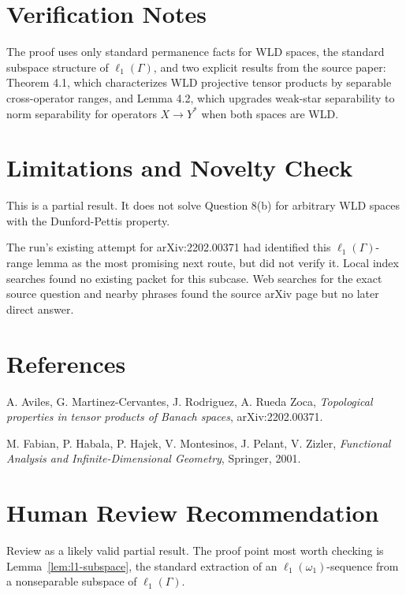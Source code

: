 \documentclass[11pt]{article}
\begin{document}
\section*{Verification Notes}

The proof uses only standard permanence facts for WLD spaces, the standard
subspace structure of \(\ell_1(\Gamma)\), and two explicit results from the
source paper: Theorem 4.1, which characterizes WLD projective tensor products
by separable cross-operator ranges, and Lemma 4.2, which upgrades weak-star
separability to norm separability for operators \(X\to Y^*\) when both spaces
are WLD.

\section*{Limitations and Novelty Check}

This is a partial result. It does not solve Question 8(b) for arbitrary WLD
spaces with the Dunford-Pettis property.

The run's existing attempt for arXiv:2202.00371 had identified this
\(\ell_1(\Gamma)\)-range lemma as the most promising next route, but did not
verify it. Local index searches found no existing packet for this subcase.
Web searches for the exact source question and nearby phrases found the source
arXiv page but no later direct answer.

\section*{References}

\begin{enumerate}[label={[\arabic*]}]
\item A. Aviles, G. Martinez-Cervantes, J. Rodriguez, A. Rueda Zoca,
\emph{Topological properties in tensor products of Banach spaces},
arXiv:2202.00371.
\item M. Fabian, P. Habala, P. Hajek, V. Montesinos, J. Pelant, V. Zizler,
\emph{Functional Analysis and Infinite-Dimensional Geometry}, Springer, 2001.
\end{enumerate}

\section*{Human Review Recommendation}

Review as a likely valid partial result. The proof point most worth checking is
Lemma~\ref{lem:l1-subspace}, the standard extraction of an
\(\ell_1(\omega_1)\)-sequence from a nonseparable subspace of
\(\ell_1(\Gamma)\).
\end{document}
